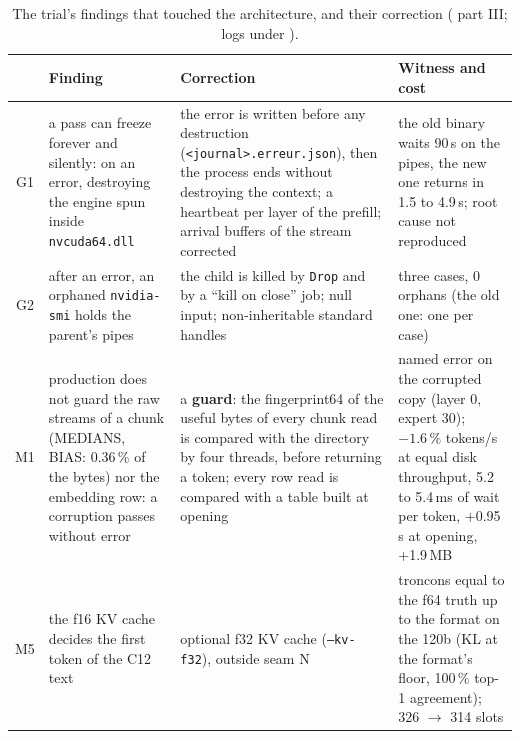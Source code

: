 \begin{table}[ht]
\centering\small
\begin{tabularx}{\linewidth}{c >{\raggedright\arraybackslash}X >{\raggedright\arraybackslash}X >{\raggedright\arraybackslash}X}
\toprule
& Finding & Correction & Witness and cost \\
\midrule
G1 & a pass can freeze forever and silently: on an error, destroying the engine spun inside \texttt{nvcuda64.dll} & the error is written before any destruction (\texttt{<journal>.erreur.json}), then the process ends without destroying the context; a heartbeat per layer of the prefill; arrival buffers of the stream corrected & the old binary waits 90\,s on the pipes, the new one returns in 1.5 to 4.9\,s; root cause not reproduced \\
G2 & after an error, an orphaned \texttt{nvidia-smi} holds the parent's pipes & the child is killed by \texttt{Drop} and by a ``kill on close'' job; null input; non-inheritable standard handles & three cases, 0 orphans (the old one: one per case) \\
M1 & production does not guard the raw streams of a chunk (MEDIANS, BIAS: 0.36\,\% of the bytes) nor the embedding row: a corruption passes without error & a \textbf{guard}: the fingerprint64 of the useful bytes of every chunk read is compared with the directory by four threads, before returning a token; every row read is compared with a table built at opening & named error on the corrupted copy (layer 0, expert 30); $-1.6\,\%$ tokens/s at equal disk throughput, 5.2 to 5.4\,ms of wait per token, +0.95\,s at opening, +1.9\,MB \\
M5 & the f16 KV cache decides the first token of the C12 text & optional f32 KV cache (\texttt{--kv-f32}), outside seam N & troncons equal to the f64 truth up to the format on the 120b (KL at the format's floor, 100\,\% top-1 agreement); 326 $\to$ 314 slots \\
\bottomrule
\end{tabularx}
\caption[What the correction round changed]{The trial's findings that touched the architecture, and their correction ( part III; logs under ).}
\label{t2arch:tab:ronde}
\end{table}

